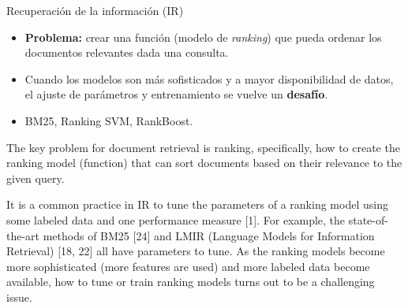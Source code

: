 \documentclass{beamer}
\begin{document}

\begin{frame}{Recuperación de la información (IR)}
    \begin{itemize}
        \item \textbf{Problema:} crear una función (modelo de \textit{ranking}) que pueda ordenar los documentos relevantes dada una consulta.
        \item Cuando los modelos son más sofisticados y a mayor disponibilidad de datos, el ajuste de parámetros y entrenamiento se vuelve un \textbf{desafío}.
        \item BM25, Ranking SVM, RankBoost.
    \end{itemize}

    \begin{note}
        {The key problem for document retrieval is ranking, specifically, how to create the ranking model (function) that can sort documents
        based on their relevance to the given query.

        It is a common practice in IR to tune the parameters of a ranking model using some labeled data and one performance measure [1]. For example, the state-of-the-art methods of BM25 [24] and LMIR (Language Models for Information Retrieval) [18, 22] all have parameters to tune. As the ranking models become more sophisticated (more features are used) and more labeled data become available, how to tune or train
        ranking models turns out to be a challenging issue.}
    \end{note}
\end{frame}
\end{document}

